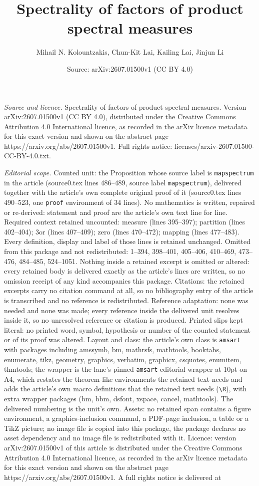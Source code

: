 \documentclass[10pt,a4paper]{amsart}
\title[Spectrality of factors of product spectral measures]{Spectrality of factors of product spectral measures}
\author{Mihail N. Kolountzakis, Chun-Kit Lai, Kailing Lai, Jinjun Li}
\date{Source: arXiv:2607.01500v1 (CC BY 4.0)}
\begin{document}
\maketitle

\noindent\emph{Source and licence.} Spectrality of factors of product spectral measures. Version arXiv:2607.01500v1 (CC BY 4.0), distributed under the Creative Commons Attribution 4.0 International licence, as recorded in the arXiv licence metadata for this exact version and shown on the abstract page https://arxiv.org/abs/2607.01500v1. Full rights notice: licenses/arxiv-2607.01500-CC-BY-4.0.txt.\par\smallskip

\noindent\textit{Editorial scope.} Counted unit: the Proposition whose source label is \texttt{mapspectrum} in the article (source0.tex lines 486--489, source label \texttt{mapspectrum}), delivered together with the article's own complete original proof of it (source0.tex lines 490--523, one \texttt{proof} environment of 34 lines). No mathematics is written, repaired or re-derived: statement and proof are the article's own text line for line. Required context retained uncounted: measure (lines 395--397); partition (lines 402--404); 3or (lines 407--409); zero (lines 470--472); mapping (lines 477--483). Every definition, display and label of those lines is retained unchanged. Omitted from this package and not redistributed: 1--394, 398--401, 405--406, 410--469, 473--476, 484--485, 524--1051. Nothing inside a retained excerpt is omitted or altered: every retained body is delivered exactly as the article's lines are written, so no omission receipt of any kind accompanies this package. Citations: the retained excerpts carry no citation command at all, so no bibliography entry of the article is transcribed and no reference is redistributed. Reference adaptation: none was needed and none was made; every reference inside the delivered unit resolves inside it, so no unresolved reference or citation is produced. Printed slips kept literal: no printed word, symbol, hypothesis or number of the counted statement or of its proof was altered. Layout and class: the article's own class is \texttt{amsart} with packages including amssymb, bm, mathrsfs, mathtools, booktabs, enumerate, tikz, geometry, graphics, verbatim, graphicx, csquotes, enumitem, thmtools; the wrapper is the lane's pinned \texttt{amsart} editorial wrapper at 10pt on A4, which restates the theorem-like environments the retained text needs and adds the article's own macro definitions that the retained text needs (\texttt{\textbackslash R}), with extra wrapper packages (bm, bbm, dsfont, xspace, cancel, mathtools). The delivered numbering is the unit's own. Assets: no retained span contains a figure environment, a graphics-inclusion command, a PDF-page inclusion, a table or a TikZ picture; no image file is copied into this package, the package declares no asset dependency and no image file is redistributed with it. Licence: version arXiv:2607.01500v1 of this article is distributed under the Creative Commons Attribution 4.0 International licence, as recorded in the arXiv licence metadata for this exact version and shown on the abstract page https://arxiv.org/abs/2607.01500v1. A full rights notice is delivered at 
\end{document}
